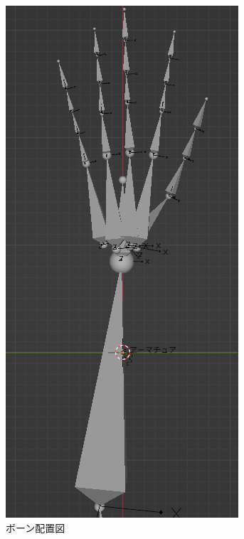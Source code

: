 \documentclass{ltjsreport}
\begin{document}
\begin{figure}[H]
\begin{minipage}{0.2\columnwidth}
			\end{minipage}
			\begin{minipage}{0.2\columnwidth}
			\centering
			\includegraphics[width = \columnwidth]{../figs/handboneLat.png}
			\end{minipage}
			\caption{ボーン配置図}
			\end{figure}
\end{document}
